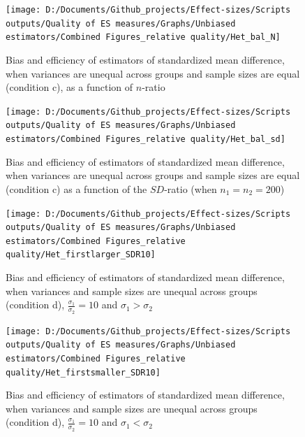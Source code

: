 \documentclass[
  man,floatsintext]{apa6}
\begin{document}
\begin{figure}

{\centering \texttt{[image: D:/Documents/Github\_projects/Effect-sizes/Scripts outputs/Quality of ES measures/Graphs/Unbiased estimators/Combined Figures\_relative quality/Het\_bal\_N]} 

}

\caption{Bias and efficiency of estimators of standardized mean difference, when variances are unequal across groups and sample sizes are equal (condition c), as a function of $n$-ratio}\label{fig:idHetbal1}
\end{figure}

\begin{figure}

{\centering \texttt{[image: D:/Documents/Github\_projects/Effect-sizes/Scripts outputs/Quality of ES measures/Graphs/Unbiased estimators/Combined Figures\_relative quality/Het\_bal\_sd]} 

}

\caption{Bias and efficiency of estimators of standardized mean difference, when variances are unequal across groups and sample sizes are equal (condition c) as a function of the $SD$-ratio (when $n_1=n_2=200$)}\label{fig:idHetbal2}
\end{figure}

\begin{figure}

{\centering \texttt{[image: D:/Documents/Github\_projects/Effect-sizes/Scripts outputs/Quality of ES measures/Graphs/Unbiased estimators/Combined Figures\_relative quality/Het\_firstlarger\_SDR10]} 

}

\caption{Bias and efficiency of estimators of standardized mean difference, when variances and sample sizes are unequal across groups (condition d), $\frac{\sigma_1}{\sigma_2}=10$ and $\sigma_1>\sigma_2$}\label{fig:idHetunbal1}
\end{figure}

\begin{figure}

{\centering \texttt{[image: D:/Documents/Github\_projects/Effect-sizes/Scripts outputs/Quality of ES measures/Graphs/Unbiased estimators/Combined Figures\_relative quality/Het\_firstsmaller\_SDR10]} 

}

\caption{Bias and efficiency of estimators of standardized mean difference, when variances and sample sizes are unequal across groups (condition d), $\frac{\sigma_1}{\sigma_2}=10$ and $\sigma_1<\sigma_2$}\label{fig:idHetunbal2}
\end{figure}
\end{document}

